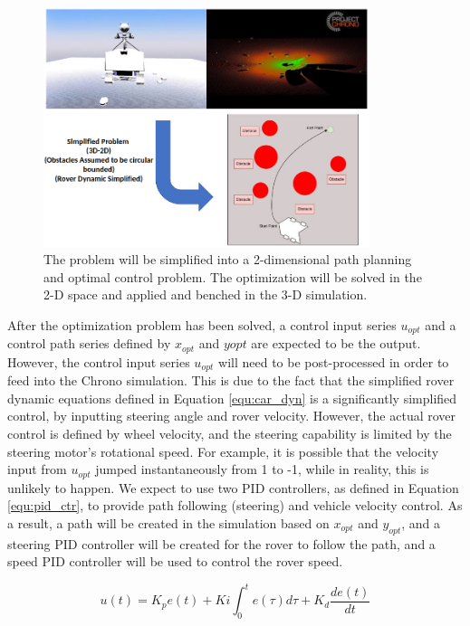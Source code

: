 \documentclass{article}
\begin{document}
 

\begin{figure}
\centering
    \label{fig:rover_path}
    \includegraphics[width=0.85\textwidth]{Images/rover_path.png}
    \caption{The problem will be simplified into a 2-dimensional path planning and optimal control problem. The optimization will be solved in the 2-D space and applied and benched in the 3-D simulation.}
\end{figure}

After the optimization problem has been solved, a control input series \(u_{opt}\) and a control path series defined by \(x_{opt}\) and \(y{opt}\) are expected to be the output. However, the control input series \(u_{opt}\) will need to be post-processed in order to feed into the Chrono simulation. This is due to the fact that the simplified rover dynamic equations defined in Equation \ref{equ:car_dyn} is a significantly simplified control, by inputting steering angle and rover velocity. However, the actual rover control is defined by wheel velocity, and the steering capability is limited by the steering motor's rotational speed. For example, it is possible that the velocity input from \(u_{opt}\) jumped instantaneously from 1 to -1, while in reality, this is unlikely to happen. We expect to use two PID controllers, as defined in Equation \ref{equ:pid_ctr}, to provide path following (steering) and vehicle velocity control. As a result, a path will be created in the simulation based on \(x_{opt}\) and \(y_{opt}\), and a steering PID controller will be created for the rover to follow the path, and a speed PID controller will be used to control the rover speed.

\begin{equation}
\label{equ:pid_ctr}
    u(t) = K_{p}e(t) + K{i}\int_{0}^{t}e(\tau)d\tau+K_{d}\frac{de(t)}{dt}
\end{equation}
\end{document}
